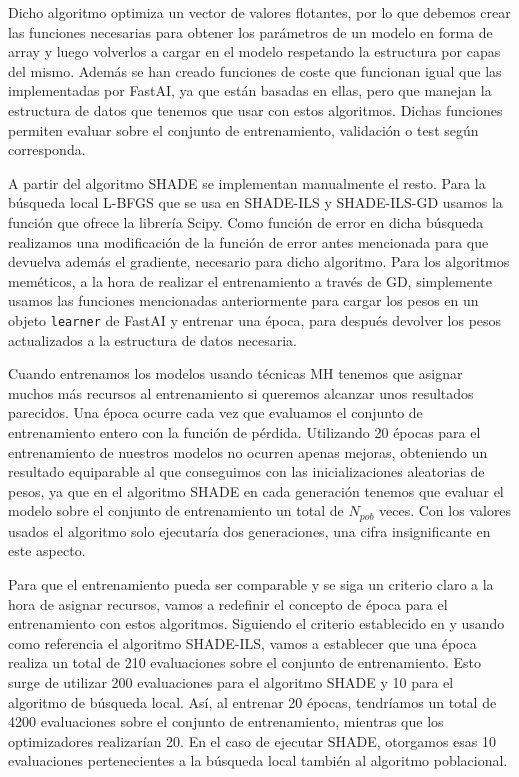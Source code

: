Dicho algoritmo optimiza un vector de valores flotantes, por lo que debemos crear las funciones necesarias para obtener los parámetros de un modelo en forma de array y luego volverlos a cargar en el modelo respetando la estructura por capas del mismo. Además se han creado funciones de coste que funcionan igual que las implementadas por FastAI, ya que están basadas en ellas, pero que manejan la estructura de datos que tenemos que usar con estos algoritmos. Dichas funciones permiten evaluar sobre el conjunto de entrenamiento, validación o test según corresponda. 

A partir del algoritmo SHADE se implementan manualmente el resto. Para la búsqueda local L-BFGS que se usa en SHADE-ILS y SHADE-ILS-GD usamos la función que ofrece la librería Scipy. Como función de error en dicha búsqueda realizamos una modificación de la función de error antes mencionada para que devuelva además el gradiente, necesario para dicho algoritmo. Para los algoritmos meméticos, a la hora de realizar el entrenamiento a través de GD, simplemente usamos las funciones mencionadas anteriormente para cargar los pesos en un objeto \verb|learner| de FastAI y entrenar una época, para después devolver los pesos actualizados a la estructura de datos necesaria.

Cuando entrenamos los modelos usando técnicas MH tenemos que asignar muchos más recursos al entrenamiento si queremos alcanzar unos resultados parecidos. Una época ocurre cada vez que evaluamos el conjunto de entrenamiento entero con la función de pérdida. Utilizando 20 épocas para el entrenamiento de nuestros modelos no ocurren apenas mejoras, obteniendo un resultado equiparable al que conseguimos con las inicializaciones aleatorias de pesos, ya que en el algoritmo SHADE en cada generación tenemos que evaluar el modelo sobre el conjunto de entrenamiento un total de $N_{pob}$ veces. Con los valores usados el algoritmo solo ejecutaría dos generaciones, una cifra insignificante en este aspecto.

Para que el entrenamiento pueda ser comparable y se siga un criterio claro a la hora de asignar recursos, vamos a redefinir el concepto de época para el entrenamiento con estos algoritmos. Siguiendo el criterio establecido en \cite{MHtrainingClase} y usando como referencia el algoritmo SHADE-ILS, vamos a establecer que una época realiza un total de 210 evaluaciones sobre el conjunto de entrenamiento. Esto surge de utilizar 200 evaluaciones para el algoritmo SHADE y 10 para el algoritmo de búsqueda local. Así, al entrenar 20 épocas, tendríamos un total de 4200 evaluaciones sobre el conjunto de entrenamiento, mientras que los optimizadores realizarían 20. En el caso de ejecutar SHADE, otorgamos esas 10 evaluaciones pertenecientes a la búsqueda local también al algoritmo poblacional.

